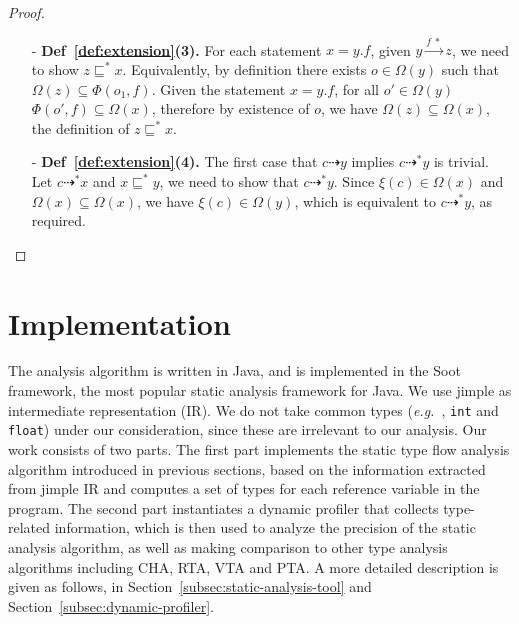 \documentclass{fac}
\newcommand\eg{\textit{e.g.\ }}
\newcommand{\VPT}{\Omega}
\newcommand{\HPT}{\Phi}
\newcommand{\less}{\sqsubseteq}
\newcommand{\tflow}{\dashrightarrow}
\newcommand{\hflow}{\longrightarrow}
\newcommand{\lhflow}[1]{\stackrel{#1}{\hflow}}
\begin{document}
\begin{proof}
\begin{itemize}
\item[-] \textbf{Def~\ref{def:extension}(3).} For each statement $x = y.f$, given $y\lhflow{f\ *}z$, we need to show $z\less^* x$. Equivalently, by definition there exists $o\in\VPT(y)$ such that $\VPT(z)\subseteq\HPT(o_1,f)$. Given the statement $x = y.f$, for all $o'\in \VPT(y)$ $\HPT(o',f)\subseteq\VPT(x)$, therefore by existence of $o$, we have $\VPT(z)\subseteq\VPT(x)$, the definition of $z\less^* x$.
\item[-] \textbf{Def~\ref{def:extension}(4).} The first case that $c\tflow y$ implies $c\tflow^* y$ is trivial. Let $c\tflow^* x$ and $x\less^*y$, we need to show that $c\tflow^*y$. Since $\xi(c)\in\VPT(x)$ and $\VPT(x)\subseteq\VPT(x)$, we have $\xi(c)\in\VPT(y)$, which is equivalent to $c\tflow^*y$, as required.
\end{itemize}
\end{proof}


\section{Implementation}\label{sec:implementation}
The analysis algorithm is written in Java, and is implemented in the Soot framework, the most popular static analysis framework for Java. We use jimple as intermediate representation (IR).
We do not take common types (\eg, \texttt{int} and \texttt{float}) under our consideration, since these are irrelevant to our analysis.
Our work consists of two parts. The first part implements the static type flow analysis algorithm introduced in previous sections, based on the information extracted from jimple IR and computes a set of types for each reference variable in the program. The second part instantiates a dynamic profiler that collects type-related information, which is then used to analyze the precision of the static analysis algorithm, as well as making comparison to other type analysis algorithms including CHA, RTA, VTA and PTA. A more detailed description is given as follows, in Section~\ref{subsec:static-analysis-tool} and Section~\ref{subsec:dynamic-profiler}.


\end{document}
